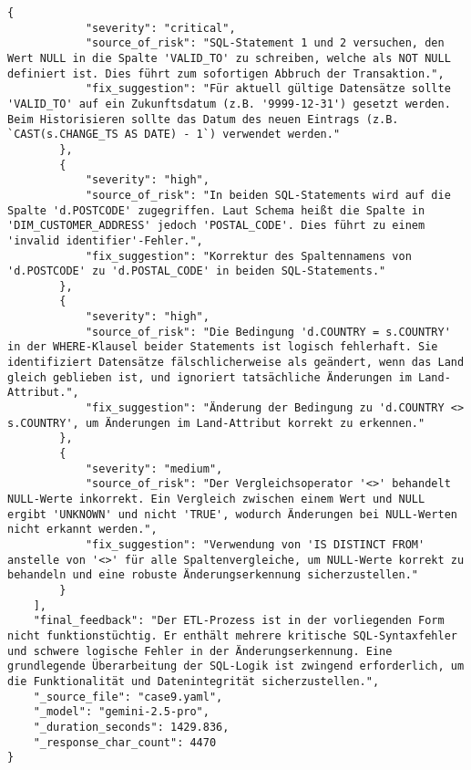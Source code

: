 \begin{lstlisting}[caption={Ausgabe: GEMINI 2.5 Pro Anwendungsfall 9 Hauptdurchlauf},label={gemini_case9_prompt1}]
        {
            "severity": "critical",
            "source_of_risk": "SQL-Statement 1 und 2 versuchen, den Wert NULL in die Spalte 'VALID_TO' zu schreiben, welche als NOT NULL definiert ist. Dies führt zum sofortigen Abbruch der Transaktion.",
            "fix_suggestion": "Für aktuell gültige Datensätze sollte 'VALID_TO' auf ein Zukunftsdatum (z.B. '9999-12-31') gesetzt werden. Beim Historisieren sollte das Datum des neuen Eintrags (z.B. `CAST(s.CHANGE_TS AS DATE) - 1`) verwendet werden."
        },
        {
            "severity": "high",
            "source_of_risk": "In beiden SQL-Statements wird auf die Spalte 'd.POSTCODE' zugegriffen. Laut Schema heißt die Spalte in 'DIM_CUSTOMER_ADDRESS' jedoch 'POSTAL_CODE'. Dies führt zu einem 'invalid identifier'-Fehler.",
            "fix_suggestion": "Korrektur des Spaltennamens von 'd.POSTCODE' zu 'd.POSTAL_CODE' in beiden SQL-Statements."
        },
        {
            "severity": "high",
            "source_of_risk": "Die Bedingung 'd.COUNTRY = s.COUNTRY' in der WHERE-Klausel beider Statements ist logisch fehlerhaft. Sie identifiziert Datensätze fälschlicherweise als geändert, wenn das Land gleich geblieben ist, und ignoriert tatsächliche Änderungen im Land-Attribut.",
            "fix_suggestion": "Änderung der Bedingung zu 'd.COUNTRY <> s.COUNTRY', um Änderungen im Land-Attribut korrekt zu erkennen."
        },
        {
            "severity": "medium",
            "source_of_risk": "Der Vergleichsoperator '<>' behandelt NULL-Werte inkorrekt. Ein Vergleich zwischen einem Wert und NULL ergibt 'UNKNOWN' und nicht 'TRUE', wodurch Änderungen bei NULL-Werten nicht erkannt werden.",
            "fix_suggestion": "Verwendung von 'IS DISTINCT FROM' anstelle von '<>' für alle Spaltenvergleiche, um NULL-Werte korrekt zu behandeln und eine robuste Änderungserkennung sicherzustellen."
        }
    ],
    "final_feedback": "Der ETL-Prozess ist in der vorliegenden Form nicht funktionstüchtig. Er enthält mehrere kritische SQL-Syntaxfehler und schwere logische Fehler in der Änderungserkennung. Eine grundlegende Überarbeitung der SQL-Logik ist zwingend erforderlich, um die Funktionalität und Datenintegrität sicherzustellen.",
    "_source_file": "case9.yaml",
    "_model": "gemini-2.5-pro",
    "_duration_seconds": 1429.836,
    "_response_char_count": 4470
}
\end{lstlisting}

